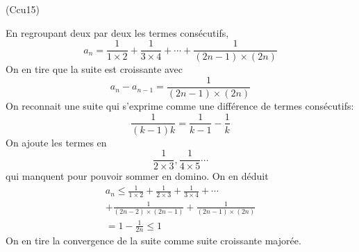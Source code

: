 \begin{tiny}(Ccu15)\end{tiny} En regroupant deux par deux les termes consécutifs,
\begin{displaymath}
  a_n = \frac{1}{1\times 2} + \frac{1}{3\times 4} +\cdots + \frac{1}{(2n-1)\times (2n)}
\end{displaymath}
On en tire que la suite est croissante avec
\begin{displaymath}
  a_n - a_{n-1} = \frac{1}{(2n-1)\times (2n)}
\end{displaymath}
On reconnait une suite qui s'exprime comme une différence de termes consécutifs:
\begin{displaymath}
  \frac{1}{(k-1)k} = \frac{1}{k-1} - \frac{1}{k}
\end{displaymath}
On ajoute les termes en 
\begin{displaymath}
\frac{1}{2\times 3}, \frac{1}{4\times 5} \cdots  
\end{displaymath}
qui manquent pour pouvoir sommer en domino. On en déduit
\begin{multline*}
  a_n \leq \frac{1}{1\times 2} + \frac{1}{2\times 3}+ \frac{1}{3\times 4} +\cdots \\
  + \frac{1}{(2n-2)\times (2n-1)}+ \frac{1}{(2n-1)\times (2n)}\\
  = 1 - \frac{1}{2n} \leq 1
\end{multline*}
On en tire la convergence de la suite comme suite croissante majorée.
